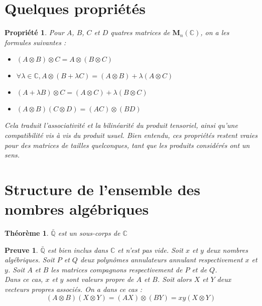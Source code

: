 \documentclass[10pt,a4paper]{article}
\newtheorem{prop}{Propriété}[section]
\newtheorem*{dem}{Preuve}
\newtheorem{thm}{Théorème}[section]
\begin{document}
\section{Quelques propriétés}
\begin{prop}
	Pour $A$, $B$, $C$ et $D$ quatres matrices de $\mathbf{M}_n(\mathbb{C})$, on a les formules suivantes :
	\begin{itemize}
		\item $(A \otimes B)\otimes C = A \otimes (B \otimes C)$
		\item $\forall \lambda \in \mathbb{C}, A \otimes (B + \lambda C)=(A \otimes B) + \lambda (A \otimes C)$
		\item $(A + \lambda B) \otimes C = (A \otimes C) + \lambda (B \otimes C)$
		\item $(A \otimes B)(C \otimes D)=(AC)\otimes (BD)$
	\end{itemize}

	Cela traduit l'associativité et la bilinéarité du produit tensoriel, ainsi qu'une compatibilité vis à vis du produit usuel. Bien entendu, ces propriétés restent vraies pour des matrices de tailles quelconques, tant que les produits considérés ont un sens. 
\end{prop}

\section{Structure de l'ensemble des nombres algébriques}

\begin{thm}
$\bar{\mathbb{Q}}$ est un sous-corps de $\mathbb{C}$
\end{thm}

\begin{dem}
$\bar{\mathbb{Q}}$ est bien inclus dans $\mathbb{C}$ et n'est pas vide. Soit $x$ et $y$ deux nombres algébriques. Soit $P$ et $Q$ deux polynômes annulateurs annulant respectivement $x$ et $y$. Soit $A$ et $B$ les matrices compagnons respectivement de $P$ et de $Q$.
\\
Dans ce cas, $x$ et $y$ sont valeurs propre de $A$ et $B$. Soit alors $X$ et $Y$ deux vecteurs propres associés. On a dans ce cas : $$(A \otimes B)(X \otimes Y)=(AX)\otimes (BY)=xy(X \otimes Y)$$ 
\end{dem}
\end{document}
